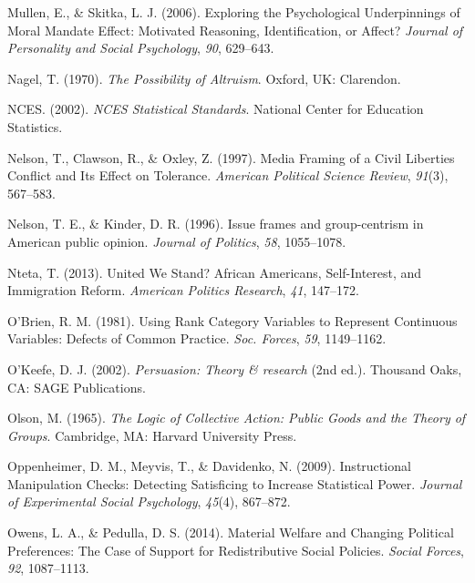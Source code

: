 \documentclass[12pt,econ]{sources/authesis}
\begin{document}
\leavevmode\hypertarget{ref-mullen_2006_exploring}{}%
Mullen, E., \& Skitka, L. J. (2006). Exploring the Psychological Underpinnings of Moral Mandate Effect: Motivated Reasoning, Identification, or Affect? \emph{Journal of Personality and Social Psychology}, \emph{90}, 629--643.

\leavevmode\hypertarget{ref-nagel_1970_possibility}{}%
Nagel, T. (1970). \emph{The Possibility of Altruism}. Oxford, UK: Clarendon.

\leavevmode\hypertarget{ref-education-statistics_2002_nces}{}%
NCES. (2002). \emph{NCES Statistical Standards}. National Center for Education Statistics.

\leavevmode\hypertarget{ref-nelson_media_1997}{}%
Nelson, T., Clawson, R., \& Oxley, Z. (1997). Media Framing of a Civil Liberties Conflict and Its Effect on Tolerance. \emph{American Political Science Review}, \emph{91}(3), 567--583.

\leavevmode\hypertarget{ref-nelson_1996_issue}{}%
Nelson, T. E., \& Kinder, D. R. (1996). Issue frames and group-centrism in American public opinion. \emph{Journal of Politics}, \emph{58}, 1055--1078.

\leavevmode\hypertarget{ref-nteta_2013_united}{}%
Nteta, T. (2013). United We Stand? African Americans, Self-Interest, and Immigration Reform. \emph{American Politics Research}, \emph{41}, 147--172.

\leavevmode\hypertarget{ref-obrien_1981_using}{}%
O'Brien, R. M. (1981). Using Rank Category Variables to Represent Continuous Variables: Defects of Common Practice. \emph{Soc. Forces}, \emph{59}, 1149--1162.

\leavevmode\hypertarget{ref-okeefe_2002_persuasion}{}%
O'Keefe, D. J. (2002). \emph{Persuasion: Theory \& research} (2nd ed.). Thousand Oaks, CA: SAGE Publications.

\leavevmode\hypertarget{ref-olson_logic_1965}{}%
Olson, M. (1965). \emph{The Logic of Collective Action: Public Goods and the Theory of Groups}. Cambridge, MA: Harvard University Press.

\leavevmode\hypertarget{ref-oppenheimer_2009_instructional}{}%
Oppenheimer, D. M., Meyvis, T., \& Davidenko, N. (2009). Instructional Manipulation Checks: Detecting Satisficing to Increase Statistical Power. \emph{Journal of Experimental Social Psychology}, \emph{45}(4), 867--872.

\leavevmode\hypertarget{ref-owens_2014_material}{}%
Owens, L. A., \& Pedulla, D. S. (2014). Material Welfare and Changing Political Preferences: The Case of Support for Redistributive Social Policies. \emph{Social Forces}, \emph{92}, 1087--1113.
\end{document}
